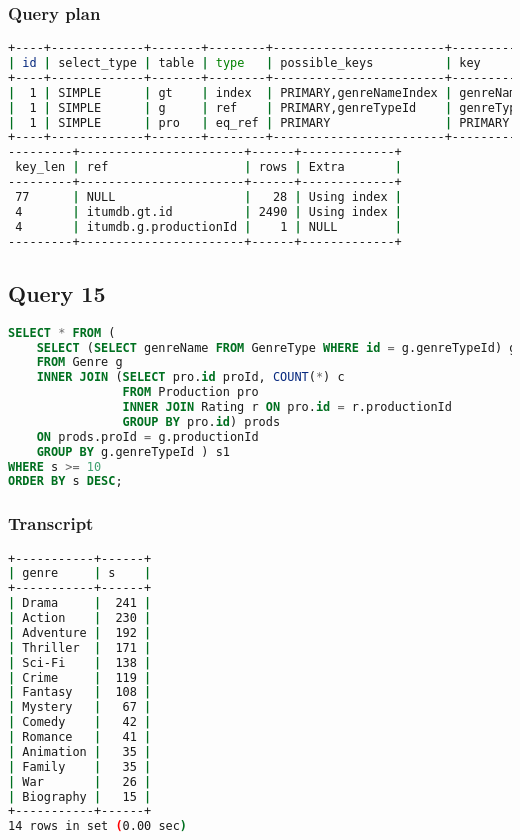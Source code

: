 \subsubsection{Query plan}
\begin{lstlisting}[language=bash]
+----+-------------+-------+--------+------------------------+----------------+
| id | select_type | table | type   | possible_keys          | key            |
+----+-------------+-------+--------+------------------------+----------------+
|  1 | SIMPLE      | gt    | index  | PRIMARY,genreNameIndex | genreNameIndex |
|  1 | SIMPLE      | g     | ref    | PRIMARY,genreTypeId    | genreTypeId    |
|  1 | SIMPLE      | pro   | eq_ref | PRIMARY                | PRIMARY        |
+----+-------------+-------+--------+------------------------+----------------+
---------+-----------------------+------+-------------+
 key_len | ref                   | rows | Extra       |
---------+-----------------------+------+-------------+
 77      | NULL                  |   28 | Using index |
 4       | itumdb.gt.id          | 2490 | Using index |
 4       | itumdb.g.productionId |    1 | NULL        |
---------+-----------------------+------+-------------+
\end{lstlisting}


\bigskip
\subsection{Query 15}
\begin{lstlisting}[language=sql]
SELECT * FROM (
	SELECT (SELECT genreName FROM GenreType WHERE id = g.genreTypeId) genre, SUM(prods.c) s
	FROM Genre g
	INNER JOIN (SELECT pro.id proId, COUNT(*) c
				FROM Production pro
				INNER JOIN Rating r ON pro.id = r.productionId
				GROUP BY pro.id) prods
	ON prods.proId = g.productionId
	GROUP BY g.genreTypeId ) s1
WHERE s >= 10
ORDER BY s DESC;
\end{lstlisting}

\subsubsection{Transcript}
\begin{lstlisting}[language=bash]
+-----------+------+
| genre     | s    |
+-----------+------+
| Drama     |  241 |
| Action    |  230 |
| Adventure |  192 |
| Thriller  |  171 |
| Sci-Fi    |  138 |
| Crime     |  119 |
| Fantasy   |  108 |
| Mystery   |   67 |
| Comedy    |   42 |
| Romance   |   41 |
| Animation |   35 |
| Family    |   35 |
| War       |   26 |
| Biography |   15 |
+-----------+------+
14 rows in set (0.00 sec)
\end{lstlisting}

